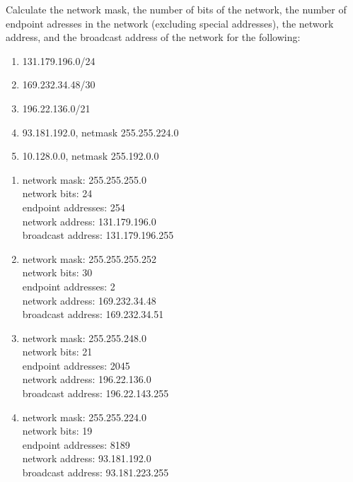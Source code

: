 \documentclass{report}
\begin{document}
\clearpage
\begin{problem}
Calculate the network mask, the number of bits of the network, the number of endpoint adresses in the network (excluding special addresses), the network address, and the broadcast address of the network for the following:

\begin{enumerate}
\item 131.179.196.0/24
\item 169.232.34.48/30
\item 196.22.136.0/21
\item 93.181.192.0, netmask 255.255.224.0
\item 10.128.0.0, netmask 255.192.0.0
\end{enumerate}


\begin{answer}{30em}
  \begin{multicols*}{2}
  \begin{enumerate}
    \item network mask: 255.255.255.0\\
          network bits: 24\\
          endpoint addresses: 254\\
          network address: 131.179.196.0\\
          broadcast address: 131.179.196.255

    \item network mask: 255.255.255.252\\
          network bits: 30\\
          endpoint addresses: 2\\
          network address: 169.232.34.48\\
          broadcast address: 169.232.34.51

    \item network mask: 255.255.248.0\\
          network bits: 21\\
          endpoint addresses: 2045\\
          network address: 196.22.136.0\\
          broadcast address: 196.22.143.255

    \item network mask: 255.255.224.0\\
          network bits: 19\\
          endpoint addresses: 8189\\
          network address: 93.181.192.0\\
          broadcast address: 93.181.223.255


\end{enumerate}
\end{multicols*}
\end{answer}
\end{problem}
\end{document}
